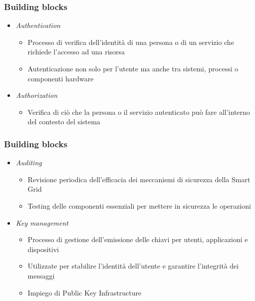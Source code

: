 \begin{frame}
  \frametitle{Building blocks}
  \begin{itemize}[<+- | alert@+>]
  \item \textit{Authentication}
  \begin{itemize}
  \item Processo di verifica dell'identità di una persona o di un servizio che richiede l'accesso ad una risorsa
  \item Autenticazione non solo per l'utente ma anche tra sistemi, processi o componenti hardware
  \end{itemize}
 \item \textit{Authorization}
 	\begin{itemize}
 		\item Verifica di ciò che la persona o il servizio autenticato può fare all'interno del contesto del sistema
 	\end{itemize}
  \end{itemize}
\end{frame}

\begin{frame}
  \frametitle{Building blocks}
  \begin{itemize}[<+- | alert@+>]
  \item \textit{Auditing}
  \begin{itemize}
  \item Revisione periodica dell'efficacia dei meccanismi di sicurezza della Smart Grid
  \item Testing delle componenti essenziali per mettere in sicurezza le operazioni
  \end{itemize}
 \item \textit{Key management}
 	\begin{itemize}
 		\item Processo di gestione dell'emissione delle chiavi per utenti, applicazioni e dispositivi
 		\item Utilizzate per stabilire l'identità dell'utente e garantire l'integrità dei messaggi
 		\item Impiego di Public Key Infrastructure
 	\end{itemize}
  \end{itemize}
\end{frame}

